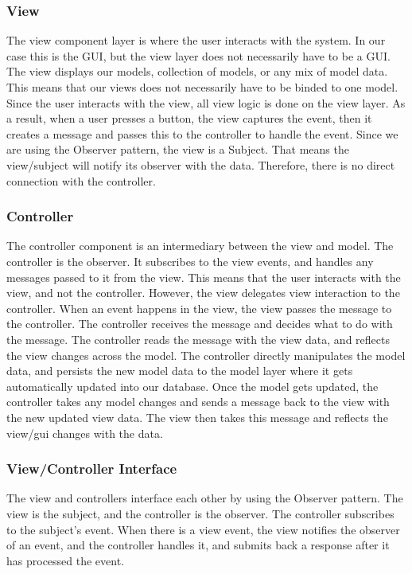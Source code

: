\documentclass[12pt]{article}
\begin{document}
\subsubsection{View}
The view component layer is where the user interacts with the system. In our case this is the GUI, but the view layer does not necessarily have to be a GUI. The view displays our models, collection of models, or any mix of model data. This means that our views does not necessarily have to be binded to one model. Since the user interacts with the view, all view logic is done on the view layer. As a result, when a user presses a button, the view captures the event, then it creates a message and passes this to the controller to handle the event. Since we are using the Observer pattern, the view is a Subject. That means the view/subject will notify its observer with the data. Therefore, there is no direct connection with the controller. 


\subsubsection{Controller}
The controller component is an intermediary between the view and model. The controller is the observer. It subscribes to the view events, and handles any messages passed to it from the view.  This means that the user interacts with the view, and not the controller. However, the view delegates view interaction to the controller. When an event happens in the view, the view passes the message to the controller. The controller receives the message and decides what to do with the message. The controller reads the message with the view data, and reflects the view changes across the model. The controller directly manipulates the model data, and persists the new model data to the model layer where it gets automatically updated into our database. Once the model gets updated, the controller takes any model changes and sends a message back to the view with the new updated view data. The view then takes this message and reflects the view/gui changes with the data.



\subsubsection{View/Controller Interface}

The view and controllers interface each other by using the Observer pattern. The view is the subject, and the controller is the observer. The controller subscribes to the subject’s event.
When there is a view event, the view notifies the observer of an event, and the controller handles it, and submits back a response after it has processed the event.
\end{document}
